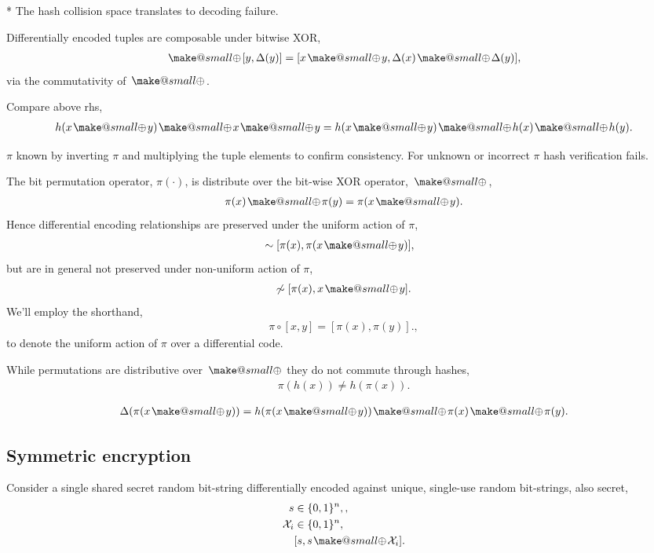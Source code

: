 \documentclass[twocolumn, aps, amsmath, amssymb, nofootinbib, superscriptaddress, longbibliography, doublefloatfix, table-of-contents, eqsecnum, rmp]{revtex4-2}
\makeatletter
\newcommand{\soplus}{{{\hspace{1pt}}{\mathbin{\mathpalette\make@small\oplus}}}{\hspace{1pt}}}
\newcommand{\make@small}[2]{%
  \vcenter{\hbox{%
    \scalebox{0.6}{$\m@th#1#2$}%
  }}%
}
\makeatother
\begin{document}
* The hash collision space translates to decoding failure.

Differentially encoded tuples are composable under bitwise XOR,
\begin{align}
	[x,\Delta(x)] \soplus [y,\Delta(y)] = [x\soplus y, \Delta(x)\soplus \Delta(y)],
\end{align}
via the commutativity of $\soplus$.

Compare above rhs,
\begin{align}
	h(x\soplus y) \soplus x \soplus y = h(x \soplus y) \soplus h(x) \soplus h(y).
\end{align}

$\pi$ known by inverting $\pi$ and multiplying the tuple elements to confirm consistency. For unknown or incorrect $\pi$ hash verification fails.

The bit permutation operator, $\pi(\cdot)$, is distribute over the bit-wise XOR operator, $\soplus$,
\begin{align}
	\pi(x)\soplus \pi(y) = \pi(x\soplus y).
\end{align}
Hence differential encoding relationships are preserved under the uniform action of $\pi$,
\begin{align}
	[x,x\soplus y] &\sim [\pi(x), \pi(x\soplus y)],
\end{align}
but are in general not preserved under non-uniform action of $\pi$,
\begin{align}
	[x,x\soplus y] \not\sim [\pi(x), x\soplus y].
\end{align}
We'll employ the shorthand,
\begin{align}
	\pi\circ[x,y] = [\pi(x),\pi(y)].,
\end{align}
to denote the uniform action of $\pi$ over a differential code.

While permutations are distributive over $\soplus$ they do not commute through hashes,
\begin{align}
	\pi(h(x)) \neq h(\pi(x)).	
\end{align}

\begin{align}
	\Delta(\pi(x\soplus y)) = h(\pi(x\soplus y)) \soplus \pi(x) \soplus \pi(y).
\end{align}

\subsection{Symmetric encryption}

Consider a single shared secret random bit-string differentially encoded against unique, single-use random bit-strings, also secret,
\begin{align}
	s &\in \{0,1\}^n,,\nonumber\\
	\mathcal{X}_i &\in \{0,1\}^n,\nonumber\\
	&[s,s\soplus \mathcal{X}_i].
\end{align}
\end{document}
